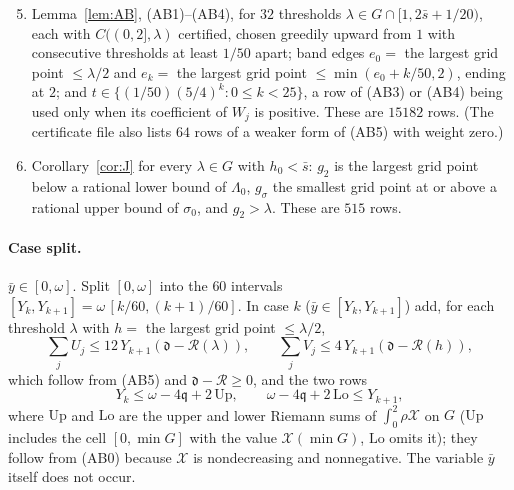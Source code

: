 \documentclass[11pt]{article}
\newcommand{\cR}{\mathcal{R}}
\newcommand{\cX}{\mathcal{X}}
\newcommand{\dd}{\mathfrak{d}}
\newcommand{\qq}{\mathfrak{q}}
\newcommand{\sbar}{\bar{s}}
\newcommand{\ybar}{\bar{y}}
\theoremstyle{remark}
\begin{document}
\begin{enumerate}\setcounter{enumi}{4}
\item Lemma~\ref{lem:AB}, (AB1)--(AB4), for $32$ thresholds
  $\lambda \in G \cap [1, 2\sbar + 1/20)$, each with $C((0,2],\lambda)$
  certified, chosen greedily upward from $1$ with consecutive thresholds at
  least $1/50$ apart; band edges $e_0 =$ the largest grid point
  $\le \lambda/2$ and $e_k =$ the largest grid point
  $\le \min(e_0 + k/50, 2)$, ending at $2$; and
  $t \in \{(1/50)(5/4)^k : 0 \le k < 25\}$, a row of (AB3) or (AB4) being
  used only when its coefficient of $W_j$ is positive. These are $15182$
  rows. (The certificate file also lists $64$ rows of a weaker form of
  (AB5) with weight zero.)
\item Corollary~\ref{cor:J} for every $\lambda \in G$ with $h_0 < \sbar$:
  $g_2$ is the largest grid point below a rational lower bound of
  $\Lambda_0$, $g_\sigma$ the smallest grid point at or above a rational
  upper bound of $\sigma_0$, and $g_2 > \lambda$. These are $515$ rows.
\end{enumerate}

\paragraph{Case split.} $\ybar \in [0,\omega]$. Split $[0,\omega]$ into the
$60$ intervals $[Y_k, Y_{k+1}] = \omega\,[k/60, (k+1)/60]$. In case $k$
($\ybar \in [Y_k, Y_{k+1}]$) add, for each threshold $\lambda$ with
$h = $ the largest grid point $\le \lambda/2$,
\[
  \textstyle\sum_j U_j \le 12\,Y_{k+1}(\dd - \cR(\lambda)), \qquad
  \sum_j V_j \le 4\,Y_{k+1}(\dd - \cR(h)),
\]
which follow from (AB5) and $\dd - \cR \ge 0$, and the two rows
\[
  Y_k \le \omega - 4\qq + 2\,\mathrm{Up}, \qquad
  \omega - 4\qq + 2\,\mathrm{Lo} \le Y_{k+1},
\]
where $\mathrm{Up}$ and $\mathrm{Lo}$ are the upper and lower Riemann sums
of $\int_0^2\rho\cX$ on $G$ ($\mathrm{Up}$ includes the cell $[0,\min G]$
with the value $\cX(\min G)$, $\mathrm{Lo}$ omits it); they follow from
(AB0) because $\cX$ is nondecreasing and nonnegative. The variable $\ybar$
itself does not occur.
\end{document}
